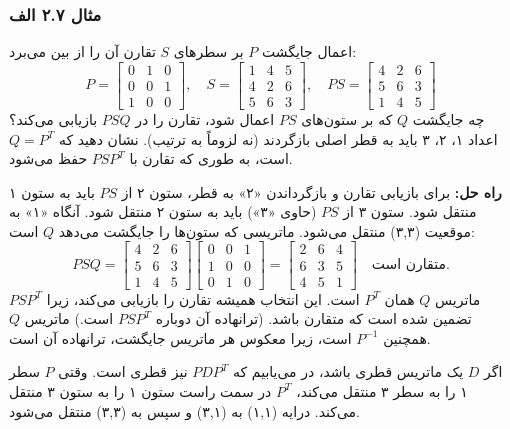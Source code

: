 \documentclass[12pt, a4paper]{book}
\begin{document}
	\subsubsection*{مثال ۲.۷ الف}
	اعمال جایگشت $P$ بر سطرهای $S$ تقارن آن را از بین می‌برد:
	\[ P = \begin{bmatrix} 0 & 1 & 0 \\ 0 & 0 & 1 \\ 1 & 0 & 0 \end{bmatrix}, \quad S = \begin{bmatrix} 1 & 4 & 5 \\ 4 & 2 & 6 \\ 5 & 6 & 3 \end{bmatrix}, \quad PS = \begin{bmatrix} 4 & 2 & 6 \\ 5 & 6 & 3 \\ 1 & 4 & 5 \end{bmatrix} \]
	چه جایگشت $Q$ که بر ستون‌های $PS$ اعمال شود، تقارن را در $PSQ$ بازیابی می‌کند؟
	اعداد ۱، ۲، ۳ باید به قطر اصلی بازگردند (نه لزوماً به ترتیب). نشان دهید که $Q=P^T$ است، به طوری که تقارن با $PSP^T$ حفظ می‌شود.
	
	\textbf{راه حل:}
	برای بازیابی تقارن و بازگرداندن «۲» به قطر، ستون ۲ از $PS$ باید به ستون ۱ منتقل شود. ستون ۳ از $PS$ (حاوی «۳») باید به ستون ۲ منتقل شود. آنگاه «۱» به موقعیت (۳,۳) منتقل می‌شود. ماتریسی که ستون‌ها را جایگشت می‌دهد $Q$ است:
	\[ PSQ = \begin{bmatrix} 4 & 2 & 6 \\ 5 & 6 & 3 \\ 1 & 4 & 5 \end{bmatrix} \begin{bmatrix} 0 & 0 & 1 \\ 1 & 0 & 0 \\ 0 & 1 & 0 \end{bmatrix} = \begin{bmatrix} 2 & 6 & 4 \\ 6 & 3 & 5 \\ 4 & 5 & 1 \end{bmatrix} \quad \text{متقارن است.} \]
	ماتریس $Q$ همان $P^T$ است. این انتخاب همیشه تقارن را بازیابی می‌کند، زیرا $PSP^T$ تضمین شده است که متقارن باشد. (ترانهاده آن دوباره $PSP^T$ است.) ماتریس $Q$ همچنین $P^{-1}$ است، زیرا معکوس هر ماتریس جایگشت، ترانهاده آن است.
	
	اگر $D$ یک ماتریس قطری باشد، در می‌یابیم که $PDP^T$ نیز قطری است. وقتی $P$ سطر ۱ را به سطر ۳ منتقل می‌کند، $P^T$ در سمت راست ستون ۱ را به ستون ۳ منتقل می‌کند. درایه (۱,۱) به (۳,۱) و سپس به (۳,۳) منتقل می‌شود.
	
\end{document}
